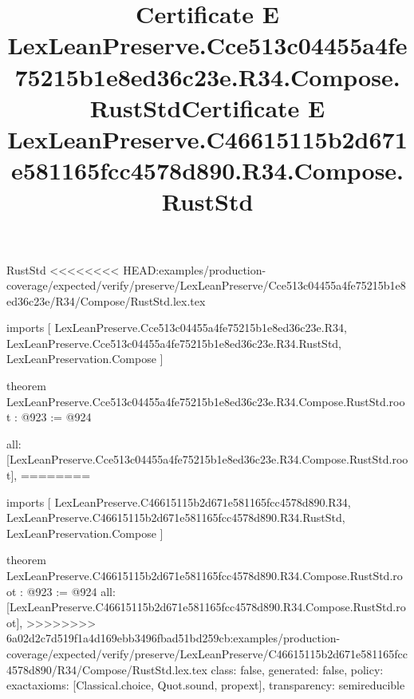 \begin{lexlean}{RustStd}
<<<<<<<< HEAD:examples/production-coverage/expected/verify/preserve/LexLeanPreserve/Cce513c04455a4fe75215b1e8ed36c23e/R34/Compose/RustStd.lex.tex
\title{Certificate E LexLeanPreserve.Cce513c04455a4fe75215b1e8ed36c23e.R34.Compose.RustStd}
\begin{coremodule}
imports [
  LexLeanPreserve.Cce513c04455a4fe75215b1e8ed36c23e.R34,
  LexLeanPreserve.Cce513c04455a4fe75215b1e8ed36c23e.R34.RustStd,
  LexLeanPreservation.Compose
]

theorem LexLeanPreserve.Cce513c04455a4fe75215b1e8ed36c23e.R34.Compose.RustStd.root : @923 := @924 {
  all: [LexLeanPreserve.Cce513c04455a4fe75215b1e8ed36c23e.R34.Compose.RustStd.root],
========
\title{Certificate E LexLeanPreserve.C46615115b2d671e581165fcc4578d890.R34.Compose.RustStd}
\begin{coremodule}
imports [
  LexLeanPreserve.C46615115b2d671e581165fcc4578d890.R34,
  LexLeanPreserve.C46615115b2d671e581165fcc4578d890.R34.RustStd,
  LexLeanPreservation.Compose
]

theorem LexLeanPreserve.C46615115b2d671e581165fcc4578d890.R34.Compose.RustStd.root : @923 := @924 {
  all: [LexLeanPreserve.C46615115b2d671e581165fcc4578d890.R34.Compose.RustStd.root],
>>>>>>>> 6a02d2c7d519f1a4d169ebb3496fbad51bd259cb:examples/production-coverage/expected/verify/preserve/LexLeanPreserve/C46615115b2d671e581165fcc4578d890/R34/Compose/RustStd.lex.tex
  class: false,
  generated: false,
  policy: exact{axioms: [Classical.choice, Quot.sound, propext]},
  transparency: semireducible
}


\end{coremodule}}
\end{coremodule}
\end{lexlean}
